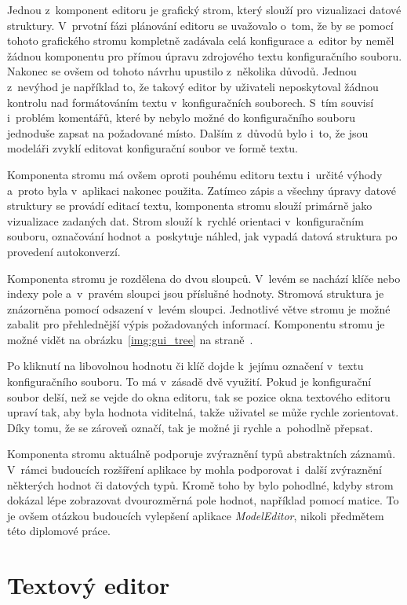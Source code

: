 \documentclass[FM,bw,DP]{tulthesis}
\begin{document}
Jednou z~komponent editoru je grafický strom, který slouží pro vizualizaci datové struktury. V~prvotní fázi plánování editoru se uvažovalo o~tom, že by se pomocí tohoto grafického stromu kompletně zadávala celá konfigurace a~editor by neměl žádnou komponentu pro přímou úpravu zdrojového textu konfiguračního souboru. Nakonec se ovšem od tohoto návrhu upustilo z~několika důvodů. Jednou z~nevýhod je například to, že takový editor by uživateli neposkytoval žádnou kontrolu nad formátováním textu v~konfiguračních souborech. S~tím souvisí i~problém komentářů, které by nebylo možné do konfiguračního souboru jednoduše zapsat na požadované místo. Dalším z~důvodů bylo i~to, že jsou modeláři zvyklí editovat konfigurační soubor ve formě textu.

Komponenta stromu má ovšem oproti pouhému editoru textu i~určité výhody a~proto byla v~aplikaci nakonec použita. Zatímco zápis a všechny úpravy datové struktury se provádí editací textu, komponenta stromu slouží primárně jako vizualizace zadaných dat. Strom slouží k~rychlé orientaci v~konfiguračním souboru, označování hodnot a~poskytuje náhled, jak vypadá datová struktura po provedení autokonverzí.

Komponenta stromu je rozdělena do dvou sloupců. V~levém se nachází klíče nebo indexy pole a~v~pravém sloupci jsou příslušné hodnoty. Stromová struktura je znázorněna pomocí odsazení v~levém sloupci. Jednotlivé větve stromu je možné zabalit pro přehlednější výpis požadovaných informací. Komponentu stromu je možné vidět na obrázku~\ref{img:gui_tree} na straně~\pageref{img:gui_tree}.

Po kliknutí na libovolnou hodnotu či klíč dojde k~jejímu označení v~textu konfiguračního souboru. To má v~zásadě dvě využití. Pokud je konfigurační soubor delší, než se vejde do okna editoru, tak se pozice okna textového editoru upraví tak, aby byla hodnota viditelná, takže uživatel se může rychle zorientovat. Díky tomu, že se zároveň označí, tak je možné ji rychle a~pohodlně přepsat.

Komponenta stromu aktuálně podporuje zvýraznění typů abstraktních záznamů. V~rámci budoucích rozšíření aplikace by mohla podporovat i~další zvýraznění někte\-rých hodnot či datových typů. Kromě toho by bylo pohodlné, kdyby strom dokázal lépe zobrazovat dvourozměrná pole hodnot, například pomocí matice. To je ovšem otázkou budoucích vylepšení aplikace \textit{ModelEditor}, nikoli předmětem této diplomové práce.

\clearpage

\section{Textový editor}
\end{document}

